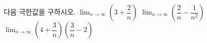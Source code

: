 다음 극한값을 구하시오.
 $\displaystyle\lim_{n\to\infty}\left(3+\dfrac{2}{n}\right)$
 $\displaystyle\lim_{n\to\infty}\left(\dfrac{2}{n}-\dfrac{1}{n^2}\right)$
 $\displaystyle\lim_{n\to\infty}\left(4+\dfrac{3}{n}\right)\!\left(\dfrac{3}{n}-2\right)$
